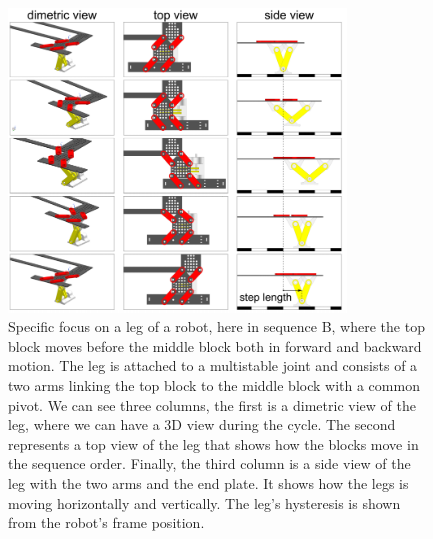         
        \begin{figure}[h!]
            \centering
            \includegraphics[width=0.8\textwidth]{images/forward_step.png}
            \caption{Specific focus on a leg of a robot, here in sequence B, where the top block moves before the middle block both in forward and backward motion. The leg is attached to a multistable joint and consists of a two arms linking the top block to the middle block with a common pivot. We can see three columns, the first is a dimetric view of the leg, where we can have a 3D view during the cycle. The second represents a top view of the leg that shows how the blocks move in the sequence order. Finally, the third column is a side view of the leg with the two arms and the end plate. It shows how the legs is moving horizontally and vertically. The leg's hysteresis is shown from the robot's frame position.}
            \label{fig:forward_step}
        \end{figure}
        
